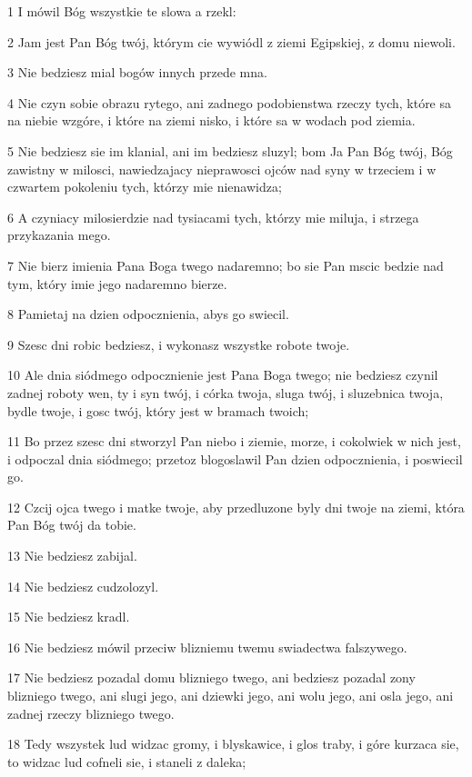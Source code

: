 \par 1 I mówil Bóg wszystkie te slowa a rzekl:
\par 2 Jam jest Pan Bóg twój, którym cie wywiódl z ziemi Egipskiej, z domu niewoli.
\par 3 Nie bedziesz mial bogów innych przede mna.
\par 4 Nie czyn sobie obrazu rytego, ani zadnego podobienstwa rzeczy tych, które sa na niebie wzgóre, i które na ziemi nisko, i które sa w wodach pod ziemia.
\par 5 Nie bedziesz sie im klanial, ani im bedziesz sluzyl; bom Ja Pan Bóg twój, Bóg zawistny w milosci, nawiedzajacy nieprawosci ojców nad syny w trzeciem i w czwartem pokoleniu tych, którzy mie nienawidza;
\par 6 A czyniacy milosierdzie nad tysiacami tych, którzy mie miluja, i strzega przykazania mego.
\par 7 Nie bierz imienia Pana Boga twego nadaremno; bo sie Pan mscic bedzie nad tym, który imie jego nadaremno bierze.
\par 8 Pamietaj na dzien odpocznienia, abys go swiecil.
\par 9 Szesc dni robic bedziesz, i wykonasz wszystke robote twoje.
\par 10 Ale dnia siódmego odpocznienie jest Pana Boga twego; nie bedziesz czynil zadnej roboty wen, ty i syn twój, i córka twoja, sluga twój, i sluzebnica twoja, bydle twoje, i gosc twój, który jest w bramach twoich;
\par 11 Bo przez szesc dni stworzyl Pan niebo i ziemie, morze, i cokolwiek w nich jest, i odpoczal dnia siódmego; przetoz blogoslawil Pan dzien odpocznienia, i poswiecil go.
\par 12 Czcij ojca twego i matke twoje, aby przedluzone byly dni twoje na ziemi, która Pan Bóg twój da tobie.
\par 13 Nie bedziesz zabijal.
\par 14 Nie bedziesz cudzolozyl.
\par 15 Nie bedziesz kradl.
\par 16 Nie bedziesz mówil przeciw blizniemu twemu swiadectwa falszywego.
\par 17 Nie bedziesz pozadal domu blizniego twego, ani bedziesz pozadal zony blizniego twego, ani slugi jego, ani dziewki jego, ani wolu jego, ani osla jego, ani zadnej rzeczy blizniego twego.
\par 18 Tedy wszystek lud widzac gromy, i blyskawice, i glos traby, i góre kurzaca sie, to widzac lud cofneli sie, i staneli z daleka;
